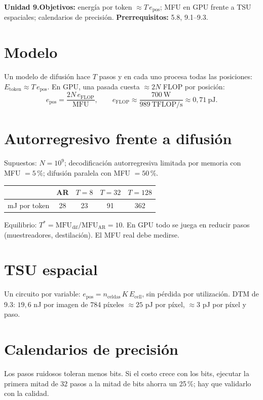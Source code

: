 \documentclass[11pt,a4paper]{article}
\begin{document}

\noindent\textbf{Unidad 9.}\quad\textbf{Objetivos:} energía por token $\approx T\,e_{\text{pos}}$; MFU en GPU frente a TSU espaciales; calendarios de precisión.
\textbf{Prerrequisitos:} 5.8, 9.1--9.3.

\section{Modelo \evE}
Un modelo de difusión hace $T$ pasos y en cada uno procesa todas las posiciones: $E_{\text{token}}\approx T\,e_{\text{pos}}$. En GPU, una pasada cuesta $\approx2N$ FLOP por posición:
\[e_{\text{pos}}=\frac{2N\,e_{\text{FLOP}}}{\text{MFU}},\qquad e_{\text{FLOP}}\approx\frac{700\ \text{W}}{989\ \text{TFLOP/s}}\approx0{,}71\ \text{pJ}.\]

\section{Autorregresivo frente a difusión}
Supuestos: $N=10^9$; decodificación autorregresiva limitada por memoria con MFU $=5\,\%$; difusión paralela con MFU $=50\,\%$.
\begin{center}\begin{tabular}{lcccc}\toprule
& AR & $T=8$ & $T=32$ & $T=128$\\\midrule
mJ por token & 28 & 23 & 91 & 362\\\bottomrule\end{tabular}\end{center}
Equilibrio: $T^\ast=\text{MFU}_{\text{dif}}/\text{MFU}_{\text{AR}}=10$. En GPU todo se juega en reducir pasos (muestreadores, destilación). El MFU real debe medirse.

\section{TSU espacial}
Un circuito por variable: $e_{\text{pos}}=n_{\text{celdas}}\,K\,E_{\text{cell}}$, sin pérdida por utilización. DTM de 9.3: $19{,}6$ nJ por imagen de 784 píxeles $\approx25$ pJ por píxel,
$\approx3$ pJ por píxel y paso.

\section{Calendarios de precisión}
Los pasos ruidosos toleran menos bits. Si el costo crece con los bits, ejecutar la primera mitad de 32 pasos a la mitad de bits ahorra un 25\,\%; hay que validarlo con la calidad.
\end{document}
